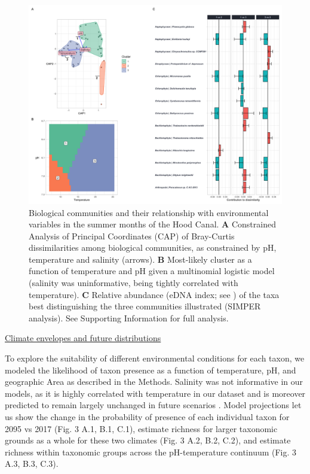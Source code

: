 \documentclass[11pt]{article}
\begin{document}
\begin{linenumbers}
\begin{figure}%
\centering
\includegraphics[width=1\linewidth]{	Figures_for_MS/Figure2.2020-09-03.png}
\caption{\footnotesize{Biological communities and their relationship with environmental variables in the summer months of the Hood Canal. \textbf{A} Constrained Analysis of Principal Coordinates (CAP) of Bray-Curtis dissimilarities among biological communities, as constrained by pH, temperature and salinity (arrows). \textbf{B} Most-likely cluster as a function of temperature and pH given a multinomial logistic model (salinity was uninformative, being tightly correlated with temperature). \textbf{C} Relative abundance (eDNA index; see \cite{kelly2019understanding}) of the taxa best distinguishing the three communities illustrated (SIMPER analysis). See Supporting Information for full analysis.}}
\label{fig:Fig2}
\end{figure}




\noindent\underline{Climate envelopes and future distributions}

To explore the suitability of different environmental conditions for each taxon, we modeled the likelihood of taxon presence as a function of temperature, pH, and geographic Area as described in the Methods. Salinity was not informative in our models, as it is highly correlated with temperature in our dataset and is moreover predicted to remain largely unchanged in future scenarios \cite{khangaonkar2019salish}. Model projections let us show the change in the probability of presence of each individual taxon for 2095 vs 2017 (Fig. 3 A.1, B.1, C.1), estimate richness for larger taxonomic grounds as a whole for these two climates (Fig. 3 A.2, B.2, C.2), and estimate richness within taxonomic groups across the pH-temperature continuum (Fig. 3 A.3, B.3, C.3). 


\end{linenumbers}
\end{document}
